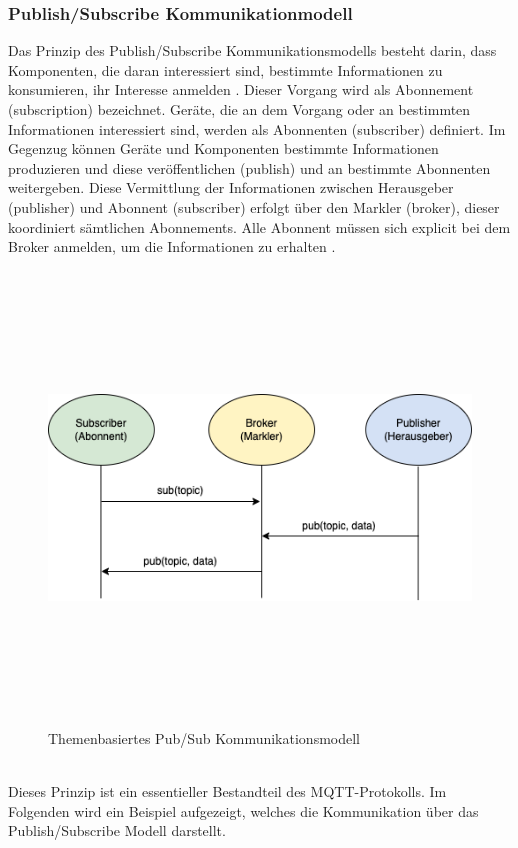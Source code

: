         \subsubsection*{Publish/Subscribe Kommunikationmodell}
        \label{subsubsec:pubsub}
            Das Prinzip des Publish/Subscribe Kommunikationsmodells besteht darin, dass Komponenten, die daran 
            interessiert sind, bestimmte Informationen zu konsumieren, ihr Interesse anmelden \cite{Hunkeler2008}. Dieser Vorgang wird als 
            Abonnement (subscription) bezeichnet. Geräte, die an dem Vorgang oder an bestimmten Informationen interessiert sind, 
            werden als Abonnenten (subscriber) definiert. Im Gegenzug können Geräte und Komponenten bestimmte Informationen produzieren und 
            diese veröffentlichen (publish) und an bestimmte Abonnenten weitergeben. Diese Vermittlung der Informationen zwischen 
            Herausgeber (publisher) und Abonnent (subscriber) erfolgt über den Markler (broker), dieser koordiniert sämtlichen Abonnements. 
            Alle Abonnent müssen sich explicit bei dem Broker anmelden, um die Informationen zu erhalten \cite{Hunkeler2008}. 
            \begin{figure}[hbt!]
                \centering
                \includegraphics[width=12cm,height=12cm,keepaspectratio]{images/sub-model.drawio.png}
                \caption{Themenbasiertes Pub/Sub Kommunikationsmodell \cite{Hunkeler2008}}
                \label{pic:pub-sub-model}
            \end{figure}
            \\
            Dieses Prinzip ist ein essentieller Bestandteil des \acs{MQTT}-Protokolls. Im Folgenden wird ein Beispiel aufgezeigt, welches 
            die Kommunikation über das Publish/Subscribe Modell darstellt.
            
